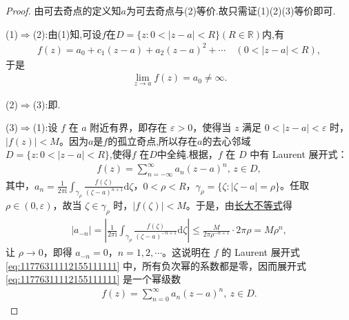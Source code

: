 \documentclass[../../main.tex]{subfiles}%
\begin{document}
\begin{proof}

由可去奇点的定义知$a$为可去奇点与(2)等价.故只需证(1)(2)(3)等价即可.

(1)$\Longrightarrow $(2):由(1)知,可设$f$在$D=\{z:0<|z-a|<R\}(R\in \mathbb{R})$内,有
\begin{align*}
f(z)=a_0+c_1(z-a)+a_2(z-a)^2+\cdots\quad (0<|z-a|<R),
\end{align*}
于是
\begin{align*}
\lim\limits_{z \to a}f(z)=a_0\neq\infty.
\end{align*}

(2)$\Longrightarrow $(3):即.

(3)$\Longrightarrow $(1):设 \( f \) 在 \( a \) 附近有界，即存在 \( \varepsilon > 0 \)，使得当 \( z \) 满足 \( 0 < |z - a| < \varepsilon \) 时，\( |f(z)| < M \)。因为$a$是$f$的孤立奇点,所以存在$a$的去心邻域\( D = \{ z: 0 < |z - a| < R \} \),使得\( f \) 在$D$中全纯.根据，\( f \) 在 \( D \) 中有 Laurent 展开式：
\begin{align}
f(z) = \sum_{n = -\infty}^{\infty} a_n (z - a)^n, \, z \in D, \label{eq:11776311112155111111}
\end{align}
其中，\( a_n = \frac{1}{2\pi \mathrm{i}} \int_{\gamma_{\rho}} \frac{f(\zeta)}{(\zeta - a)^{n + 1}} \mathrm{d}\zeta \)，\( 0 < \rho < R \)，\( \gamma_{\rho} = \{ \zeta: |\zeta - a| = \rho \} \)。任取 \( \rho\in (0,\varepsilon)  \)，故当 \( \zeta \in \gamma_{\rho} \) 时，\( |f(\zeta)| < M \)。于是，由\hyperref[theorem:长大不等式]{长大不等式}得
\begin{align*}
|a_{-n}| = \left| \frac{1}{2\pi \mathrm{i}} \int_{\gamma_{\rho}} \frac{f(\zeta)}{(\zeta - a)^{-n + 1}} \mathrm{d}\zeta \right| \leqslant  \frac{M}{2\pi \rho^{-n + 1}} \cdot 2\pi \rho = M \rho^n,
\end{align*}
让 \( \rho \to 0 \)，即得 \( a_{-n} = 0 \)，\( n = 1, 2, \cdots \)。这说明在 \( f \) 的 Laurent 展开式 \eqref{eq:11776311112155111111} 中，所有负次幂的系数都是零，因而展开式 \eqref{eq:11776311112155111111} 是一个幂级数
\begin{align*}
f(z)=\sum_{n=0}^{\infty}{a_n\left( z-a \right) ^n},\ z\in D.
\end{align*}

\end{proof}
\end{document}
